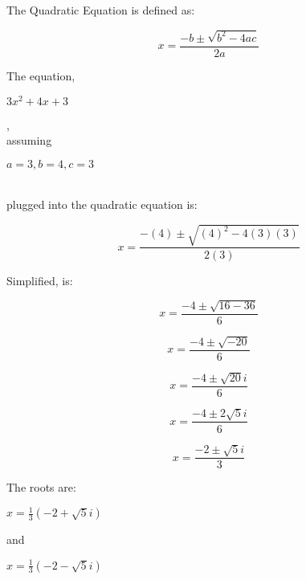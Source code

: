 \documentclass[12pt]{article}
\begin{document}
	\begin{center}
		The Quadratic Equation is defined as:
	\end{center} 
	\begin{Large}
		$$x = \frac{-b \pm \sqrt{b^2 - 4ac}}{2a}$$	
	\end{Large}
	\begin{center} 
		The equation, 
			\begin{Large}
				$3x^2 + 4x + 3$
			\end{Large}, 
		\\assuming
			\begin{Large}
				$a = 3, b = 4, c = 3$
			\end{Large}
		\\ plugged into the quadratic equation is:
	\end{center}
	\begin{Large}
		$$x = \frac{-(4) \pm \sqrt{(4)^2 - 4(3)(3)}}{2(3)}$$
	\end{Large}
	\begin{center}
		Simplified, is:
	\end{center}
	\begin{Large}
		$$x = \frac{-4 \pm \sqrt{16 - 36}}{6}$$
	\end{Large}
	\begin{Large}
		$$x = \frac{-4 \pm \sqrt{-20}}{6}$$
	\end{Large}
	\begin{Large}
		$$x = \frac{-4 \pm \sqrt{20}i}{6}$$
	\end{Large}
	\begin{Large}
		$$x = \frac{-4 \pm 2\sqrt{5}i}{6}$$
	\end{Large}
	\begin{Large}
		$$x = \frac{-2 \pm \sqrt{5}i}{3}$$
	\end{Large}
	\begin{center}
		The roots are:
		\begin{Large}
			$x = \displaystyle\frac{1}{3}(-2 + \sqrt{5}i)$ 
		\end{Large}
		and
		\begin{Large}
			$x = \displaystyle\frac{1}{3}(-2 - \sqrt{5}i)$
		\end{Large}
	\end{center}
\end{document}
